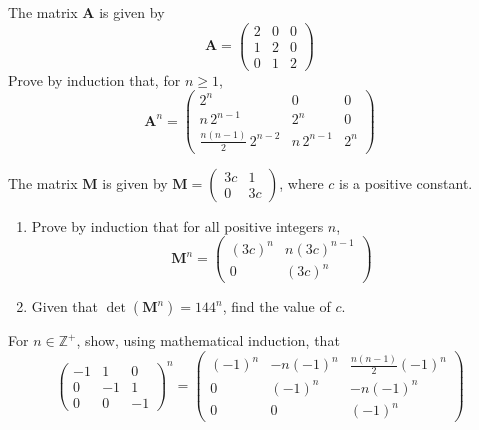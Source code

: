 \documentclass[leqno]{article}
\begin{document}
\begin{enumerate}[
  label=\textbf{\arabic*.},
  leftmargin=*,
  topsep=0pt,
  partopsep=0pt,
  parsep=0pt
]
\newpage

\questionitem

The matrix $\mathbf{A}$ is given by
\[
\mathbf{A} = \begin{pmatrix} 2 & 0 & 0 \\ 1 & 2 & 0 \\ 0 & 1 & 2 \end{pmatrix}
\]
Prove by induction that, for $n \geq 1$,
\[
\renewcommand{\arraystretch}{1.2}
\mathbf{A}^n = \begin{pmatrix} 2^n & 0 & 0 \\ n\,2^{n-1} & 2^n & 0 \\ \frac{n(n-1)}{2}\,2^{n-2} & n\,2^{n-1} & 2^n \end{pmatrix}
\]

\newpage

\questionitem

The matrix $\mathbf{M}$ is given by $\mathbf{M} = \begin{pmatrix}3c & 1 \\ 0 & 3c\end{pmatrix}$, where $c$ is a positive constant. \\
\begin{enumerate}[label=\textbf{(\alph*)}]
  \item Prove by induction that for all positive integers $n$,
  \[
  \mathbf{M}^n = \begin{pmatrix}(3c)^n & n(3c)^{n-1} \\ 0 & (3c)^n\end{pmatrix}
  \]
  \item Given that $\det(\mathbf{M}^n) = 144^n$, find the value of $c$.  \\
\end{enumerate}

\newpage

\questionitem

For $n \in \mathbb{Z}^{+}$, show, using mathematical induction, that
\[
\renewcommand{\arraystretch}{1.4}
\begin{pmatrix}

-1 & 1 & 0 \\
0 & -1 & 1 \\
0 & 0 & -1
\end{pmatrix}^{n}
=
\begin{pmatrix}
(-1)^{n} & -n(-1)^{n} & \frac{n(n-1)}{2}(-1)^{n} \\
0 & (-1)^{n} & -n(-1)^{n} \\
0 & 0 & (-1)^{n}
\end{pmatrix}
\]


\end{enumerate}
\end{document}
